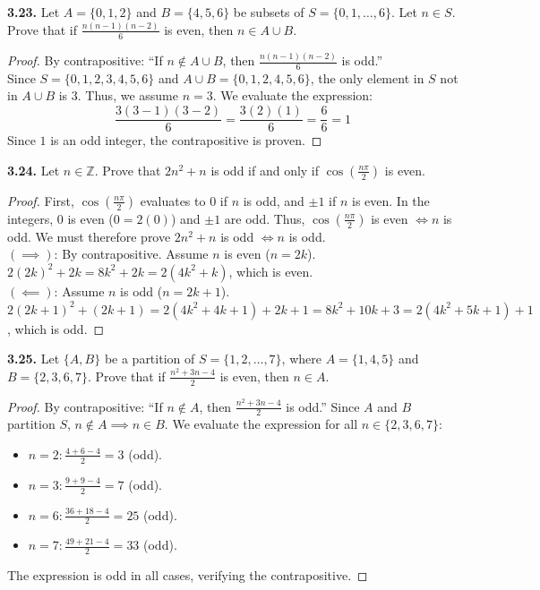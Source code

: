 \documentclass[11pt]{article}
\begin{document}
\textbf{3.23.} Let $A = \{0, 1, 2\}$ and $B = \{4, 5, 6\}$ be subsets of $S = \{0, 1, \dots, 6\}$. Let $n \in S$. Prove that if $\frac{n(n - 1)(n - 2)}{6}$ is even, then $n \in A \cup B$.
\begin{proof}
By contrapositive: ``If $n \notin A \cup B$, then $\frac{n(n - 1)(n - 2)}{6}$ is odd.'' \\
Since $S = \{0, 1, 2, 3, 4, 5, 6\}$ and $A \cup B = \{0, 1, 2, 4, 5, 6\}$, the only element in $S$ not in $A \cup B$ is $3$. Thus, we assume $n = 3$. We evaluate the expression:
\[ \frac{3(3 - 1)(3 - 2)}{6} = \frac{3(2)(1)}{6} = \frac{6}{6} = 1 \]
Since $1$ is an odd integer, the contrapositive is proven.
\end{proof}

\textbf{3.24.} Let $n \in \mathbb{Z}$. Prove that $2n^2 + n$ is odd if and only if $\cos\left(\frac{n\pi}{2}\right)$ is even.
\begin{proof}
First, $\cos(\frac{n\pi}{2})$ evaluates to $0$ if $n$ is odd, and $\pm 1$ if $n$ is even. In the integers, $0$ is even ($0 = 2(0)$) and $\pm 1$ are odd. Thus, $\cos(\frac{n\pi}{2})$ is even $\iff n$ is odd. We must therefore prove $2n^2 + n$ is odd $\iff n$ is odd. \\
$(\implies)$: By contrapositive. Assume $n$ is even ($n = 2k$). $2(2k)^2 + 2k = 8k^2 + 2k = 2(4k^2 + k)$, which is even. \\
$(\impliedby)$: Assume $n$ is odd ($n = 2k + 1$). $2(2k + 1)^2 + (2k + 1) = 2(4k^2 + 4k + 1) + 2k + 1 = 8k^2 + 10k + 3 = 2(4k^2 + 5k + 1) + 1$, which is odd. 
\end{proof}

\textbf{3.25.} Let $\{A, B\}$ be a partition of $S = \{1, 2, \dots, 7\}$, where $A = \{1, 4, 5\}$ and $B = \{2, 3, 6, 7\}$. Prove that if $\frac{n^2 + 3n - 4}{2}$ is even, then $n \in A$.
\begin{proof}
By contrapositive: ``If $n \notin A$, then $\frac{n^2 + 3n - 4}{2}$ is odd.'' Since $A$ and $B$ partition $S$, $n \notin A \implies n \in B$. We evaluate the expression for all $n \in \{2, 3, 6, 7\}$:
\begin{itemize}
    \item $n=2: \frac{4 + 6 - 4}{2} = 3$ (odd).
    \item $n=3: \frac{9 + 9 - 4}{2} = 7$ (odd).
    \item $n=6: \frac{36 + 18 - 4}{2} = 25$ (odd).
    \item $n=7: \frac{49 + 21 - 4}{2} = 33$ (odd).
\end{itemize}
The expression is odd in all cases, verifying the contrapositive.
\end{proof}
\end{document}
